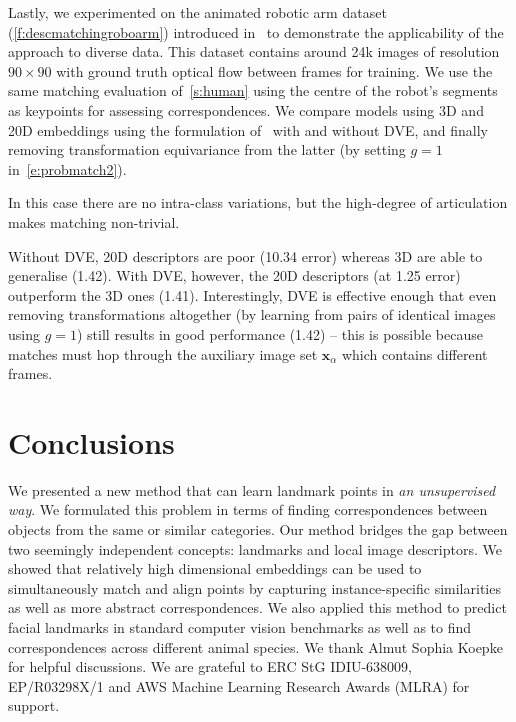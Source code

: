 \documentclass[10pt,twocolumn,letterpaper]{article}
\makeatletter
\newcommand{\bx}{\mathbf{x}}
\renewcommand{\paragraph}{\@startsection{paragraph}{4}{\z@}{0.5em}{-1em}{\normalfont\normalsize\bfseries}}
\makeatother
\begin{document}
Lastly, we experimented on the animated robotic arm dataset (\cref{f:descmatchingroboarm}) introduced in~\cite{thewlis17Bunsupervised} to demonstrate the applicability of the approach to diverse data.
This dataset contains around 24k images of resolution $90\times 90$ with ground truth optical flow between frames for training.
We use the same matching evaluation of~\cref{s:human} using the centre of the robot's segments as keypoints for assessing correspondences.
We compare models using 3D and 20D embeddings using the formulation of~\cite{thewlis17Bunsupervised} with and without DVE, and finally removing transformation equivariance from the latter (by setting $g=1$ in~\cref{e:probmatch2}).

In this case there are no intra-class variations, but the high-degree of articulation makes matching non-trivial.

Without DVE, 20D descriptors are poor (10.34 error) whereas 3D are able to generalise (1.42). With DVE, however, the 20D descriptors (at 1.25 error) outperform the 3D ones (1.41).
Interestingly, DVE is effective enough that even removing transformations altogether (by learning from pairs of identical images using $g=1$) still results in good performance (1.42) -- this is possible because matches must hop through the auxiliary image set $\bx_\alpha$ which contains different frames.

 \section{Conclusions}\label{s:conc}

We presented a new method that can learn landmark points in \emph{an unsupervised way}.
We formulated this problem in terms of finding correspondences between objects from the same or similar categories.
Our method bridges the gap between two seemingly independent concepts: landmarks and local image descriptors.
We showed that relatively high dimensional embeddings can be used to simultaneously match and align points by capturing instance-specific similarities as well as more abstract correspondences.
We also applied this method to predict facial landmarks in standard computer vision benchmarks as well as to find  correspondences across different animal species. \paragraph{Acknowledgements.} We thank Almut Sophia Koepke for helpful discussions.  We are grateful to ERC StG IDIU-638009, EP/R03298X/1 and AWS Machine Learning Research Awards (MLRA) for support.
{\clearpage}
\end{document}
